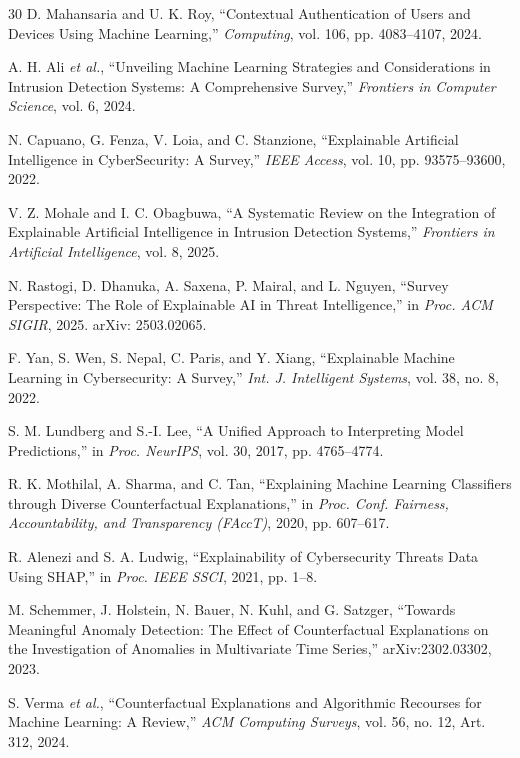 \documentclass[conference]{IEEEtran}
\begin{document}
\begin{thebibliography}{30}
D. Mahansaria and U. K. Roy, ``Contextual Authentication of Users and Devices Using Machine Learning,'' \textit{Computing}, vol. 106, pp. 4083--4107, 2024.

A. H. Ali \textit{et al.}, ``Unveiling Machine Learning Strategies and Considerations in Intrusion Detection Systems: A Comprehensive Survey,'' \textit{Frontiers in Computer Science}, vol. 6, 2024.

N. Capuano, G. Fenza, V. Loia, and C. Stanzione, ``Explainable Artificial Intelligence in CyberSecurity: A Survey,'' \textit{IEEE Access}, vol. 10, pp. 93575--93600, 2022.

V. Z. Mohale and I. C. Obagbuwa, ``A Systematic Review on the Integration of Explainable Artificial Intelligence in Intrusion Detection Systems,'' \textit{Frontiers in Artificial Intelligence}, vol. 8, 2025.

N. Rastogi, D. Dhanuka, A. Saxena, P. Mairal, and L. Nguyen, ``Survey Perspective: The Role of Explainable AI in Threat Intelligence,'' in \textit{Proc. ACM SIGIR}, 2025. arXiv: 2503.02065.

F. Yan, S. Wen, S. Nepal, C. Paris, and Y. Xiang, ``Explainable Machine Learning in Cybersecurity: A Survey,'' \textit{Int. J. Intelligent Systems}, vol. 38, no. 8, 2022.

S. M. Lundberg and S.-I. Lee, ``A Unified Approach to Interpreting Model Predictions,'' in \textit{Proc. NeurIPS}, vol. 30, 2017, pp. 4765--4774.

R. K. Mothilal, A. Sharma, and C. Tan, ``Explaining Machine Learning Classifiers through Diverse Counterfactual Explanations,'' in \textit{Proc. Conf. Fairness, Accountability, and Transparency (FAccT)}, 2020, pp. 607--617.

R. Alenezi and S. A. Ludwig, ``Explainability of Cybersecurity Threats Data Using SHAP,'' in \textit{Proc. IEEE SSCI}, 2021, pp. 1--8.

M. Schemmer, J. Holstein, N. Bauer, N. Kuhl, and G. Satzger, ``Towards Meaningful Anomaly Detection: The Effect of Counterfactual Explanations on the Investigation of Anomalies in Multivariate Time Series,'' arXiv:2302.03302, 2023.

S. Verma \textit{et al.}, ``Counterfactual Explanations and Algorithmic Recourses for Machine Learning: A Review,'' \textit{ACM Computing Surveys}, vol. 56, no. 12, Art. 312, 2024.


\end{thebibliography}
\end{document}
